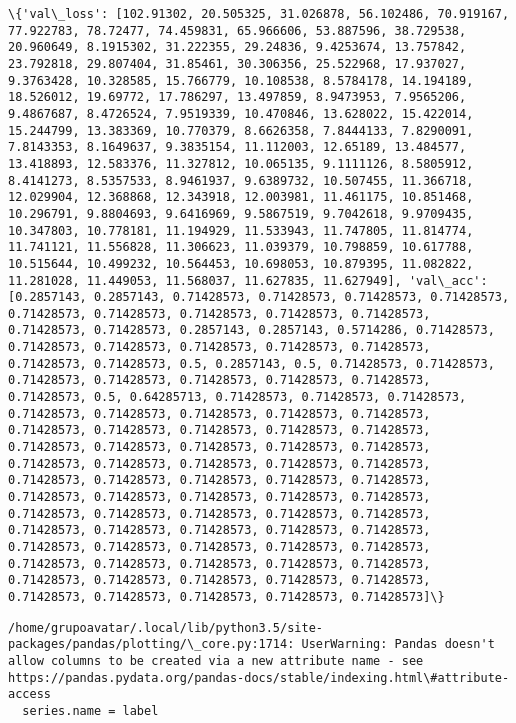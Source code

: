 \documentclass[11pt]{article}
\begin{document}
    \begin{Verbatim}[commandchars=\\\{\}]
\{'val\_loss': [102.91302, 20.505325, 31.026878, 56.102486, 70.919167, 77.922783, 78.72477, 74.459831, 65.966606, 53.887596, 38.729538, 20.960649, 8.1915302, 31.222355, 29.24836, 9.4253674, 13.757842, 23.792818, 29.807404, 31.85461, 30.306356, 25.522968, 17.937027, 9.3763428, 10.328585, 15.766779, 10.108538, 8.5784178, 14.194189, 18.526012, 19.69772, 17.786297, 13.497859, 8.9473953, 7.9565206, 9.4867687, 8.4726524, 7.9519339, 10.470846, 13.628022, 15.422014, 15.244799, 13.383369, 10.770379, 8.6626358, 7.8444133, 7.8290091, 7.8143353, 8.1649637, 9.3835154, 11.112003, 12.65189, 13.484577, 13.418893, 12.583376, 11.327812, 10.065135, 9.1111126, 8.5805912, 8.4141273, 8.5357533, 8.9461937, 9.6389732, 10.507455, 11.366718, 12.029904, 12.368868, 12.343918, 12.003981, 11.461175, 10.851468, 10.296791, 9.8804693, 9.6416969, 9.5867519, 9.7042618, 9.9709435, 10.347803, 10.778181, 11.194929, 11.533943, 11.747805, 11.814774, 11.741121, 11.556828, 11.306623, 11.039379, 10.798859, 10.617788, 10.515644, 10.499232, 10.564453, 10.698053, 10.879395, 11.082822, 11.281028, 11.449053, 11.568037, 11.627835, 11.627949], 'val\_acc': [0.2857143, 0.2857143, 0.71428573, 0.71428573, 0.71428573, 0.71428573, 0.71428573, 0.71428573, 0.71428573, 0.71428573, 0.71428573, 0.71428573, 0.71428573, 0.2857143, 0.2857143, 0.5714286, 0.71428573, 0.71428573, 0.71428573, 0.71428573, 0.71428573, 0.71428573, 0.71428573, 0.71428573, 0.5, 0.2857143, 0.5, 0.71428573, 0.71428573, 0.71428573, 0.71428573, 0.71428573, 0.71428573, 0.71428573, 0.71428573, 0.5, 0.64285713, 0.71428573, 0.71428573, 0.71428573, 0.71428573, 0.71428573, 0.71428573, 0.71428573, 0.71428573, 0.71428573, 0.71428573, 0.71428573, 0.71428573, 0.71428573, 0.71428573, 0.71428573, 0.71428573, 0.71428573, 0.71428573, 0.71428573, 0.71428573, 0.71428573, 0.71428573, 0.71428573, 0.71428573, 0.71428573, 0.71428573, 0.71428573, 0.71428573, 0.71428573, 0.71428573, 0.71428573, 0.71428573, 0.71428573, 0.71428573, 0.71428573, 0.71428573, 0.71428573, 0.71428573, 0.71428573, 0.71428573, 0.71428573, 0.71428573, 0.71428573, 0.71428573, 0.71428573, 0.71428573, 0.71428573, 0.71428573, 0.71428573, 0.71428573, 0.71428573, 0.71428573, 0.71428573, 0.71428573, 0.71428573, 0.71428573, 0.71428573, 0.71428573, 0.71428573, 0.71428573, 0.71428573, 0.71428573, 0.71428573]\}

    \end{Verbatim}

    \begin{Verbatim}[commandchars=\\\{\}]
/home/grupoavatar/.local/lib/python3.5/site-packages/pandas/plotting/\_core.py:1714: UserWarning: Pandas doesn't allow columns to be created via a new attribute name - see https://pandas.pydata.org/pandas-docs/stable/indexing.html\#attribute-access
  series.name = label

    \end{Verbatim}
\end{document}

